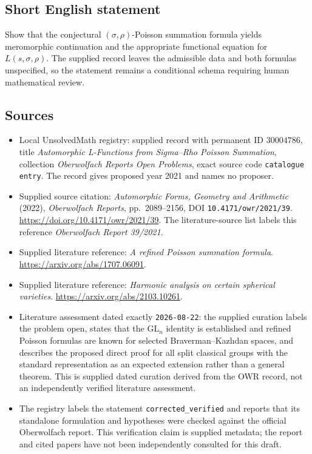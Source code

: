 \documentclass[11pt]{article}
\begin{document}
\subsection{Short English statement}
Show that the conjectural \((\sigma,\rho)\)-Poisson summation formula yields meromorphic continuation and the appropriate functional equation for \(L(s,\sigma,\rho)\). The supplied record leaves the admissible data and both formulas unspecified, so the statement remains a conditional schema requiring human mathematical review.
\subsection{Sources}
\begin{itemize}
\item Local UnsolvedMath registry: supplied record with permanent ID \(30004786\), title \emph{Automorphic L-Functions from Sigma--Rho Poisson Summation}, collection \emph{Oberwolfach Reports Open Problems}, exact source code \texttt{catalogue entry}. The record gives proposed year 2021 and names no proposer.
\item Supplied source citation: \emph{Automorphic Forms, Geometry and Arithmetic} (2022), \emph{Oberwolfach Reports}, pp.~2089--2156, DOI \texttt{10.4171/owr/2021/39}. \url{https://doi.org/10.4171/owr/2021/39}. The literature-source list labels this reference \emph{Oberwolfach Report 39/2021}.
\item Supplied literature reference: \emph{A refined Poisson summation formula}. \url{https://arxiv.org/abs/1707.06091}.
\item Supplied literature reference: \emph{Harmonic analysis on certain spherical varieties}. \url{https://arxiv.org/abs/2103.10261}.
\item Literature assessment dated exactly \texttt{2026-08-22}: the supplied curation labels the problem open, states that the \(\mathrm{GL}_n\) identity is established and refined Poisson formulas are known for selected Braverman--Kazhdan spaces, and describes the proposed direct proof for all split classical groups with the standard representation as an expected extension rather than a general theorem. This is supplied dated curation derived from the OWR record, not an independently verified literature assessment.
\item The registry labels the statement \texttt{corrected\_verified} and reports that its standalone formulation and hypotheses were checked against the official Oberwolfach report. This verification claim is supplied metadata; the report and cited papers have not been independently consulted for this draft.
\end{itemize}
\end{document}
